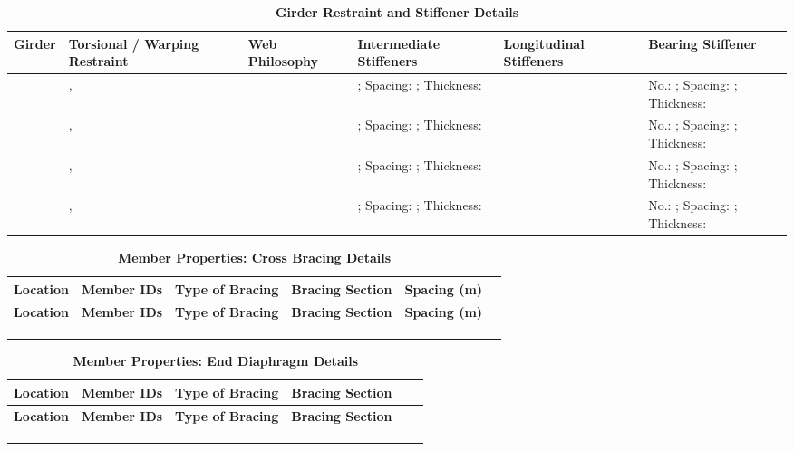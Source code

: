 \documentclass[12pt,a4paper]{report}
\numberwithin{table}{chapter}
\numberwithin{figure}{chapter}
\begin{document}
\vspace{4pt}
\begin{longtable}{|L{1.4cm}|p{2.2cm}|p{2.2cm}|p{3.0cm}|p{2.4cm}|p{2.2cm}|}
\caption{\textbf{Girder Restraint and Stiffener Details}}\\
\hline
\textbf{Girder} & \textbf{Torsional / Warping Restraint} & \textbf{Web Philosophy} & \textbf{Intermediate Stiffeners} & \textbf{Longitudinal Stiffeners} & \textbf{Bearing Stiffener} \\[6pt]
\hline
\endfirsthead
\endhead

 & ,  &  & ; Spacing: ; Thickness:  &  & No.: ; Spacing: ; Thickness:  \\[8pt]
\hline
 & ,  &  & ; Spacing: ; Thickness:  &  & No.: ; Spacing: ; Thickness:  \\[8pt]
\hline
 & ,  &  & ; Spacing: ; Thickness:  &  & No.: ; Spacing: ; Thickness:  \\[8pt]
\hline
 & ,  &  & ; Spacing: ; Thickness:  &  & No.: ; Spacing: ; Thickness:  \\[8pt]
\hline
\end{longtable}



\newpage

\vspace{0.4em}
\setlength{\tabcolsep}{4pt}
\setlength\LTleft{0pt}
\setlength\LTright{\fill}

\begin{longtable}{|L{2.2cm}|L{2.2cm}|L{3.0cm}|L{2.5cm}|C{1.8cm}|C{1.8cm}|}
\caption{\textbf{Member Properties: Cross Bracing Details}}
\hline
{} \textbf{Location} & \textbf{Member IDs} & \textbf{Type of Bracing} & \textbf{Bracing Section} & \textbf{Spacing (m)} \\
\hline
\endfirsthead
\hline
{} \textbf{Location} & \textbf{Member IDs} & \textbf{Type of Bracing} & \textbf{Bracing Section} & \textbf{Spacing (m)} \\
\hline
\endhead
 &  &  &  &  \\[6pt]
\hline
 &  &  &  &  \\[6pt]
\hline
 &  &  &  &  \\[6pt]
\hline
\end{longtable}

\vspace{0.4em}
\noindent
\setlength{\tabcolsep}{4pt}
\setlength\LTleft{0pt}
\setlength\LTright{\fill}

\begin{longtable}{|L{2.2cm}|L{2.2cm}|L{3.0cm}|L{2.5cm}|C{1.8cm}|C{1.8cm}|}
\caption{\textbf{Member Properties: End Diaphragm Details}}
\hline
{} \textbf{Location} & \textbf{Member IDs} & \textbf{Type of Bracing} & \textbf{Bracing Section} \\
\hline
\endfirsthead
\hline
{} \textbf{Location} & \textbf{Member IDs} & \textbf{Type of Bracing} & \textbf{Bracing Section} \\
\hline
\endhead
 &  &  &  \\[6pt]
\hline
 &  &  &  \\[6pt]
\hline
 &  &  &  \\[6pt]
\hline
\end{longtable}
\end{document}
